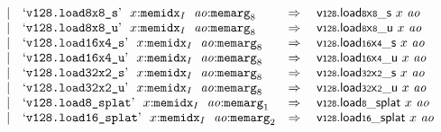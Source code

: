 $$\begin{array}[t]{@{}lrrl@{}l@{}l@{}l@{}}
& & | & \mbox{‘\texttt{v128.load8x8\_s}’}~~x{:}{{\mathtt{memidx}}}_{I}~~{\mathit{ao}}{:}{{\mathtt{memarg}}}_{8} & \quad\Rightarrow\quad{} & {\mathsf{v{\scriptstyle 128}}{.}\mathsf{load}}{{\mathsf{{\scriptstyle 8}}}{\mathsf{x}}{\mathsf{{\scriptstyle 8}}}{\mathsf{\_}}{\mathsf{s}}}~x~{\mathit{ao}} \\
& & | & \mbox{‘\texttt{v128.load8x8\_u}’}~~x{:}{{\mathtt{memidx}}}_{I}~~{\mathit{ao}}{:}{{\mathtt{memarg}}}_{8} & \quad\Rightarrow\quad{} & {\mathsf{v{\scriptstyle 128}}{.}\mathsf{load}}{{\mathsf{{\scriptstyle 8}}}{\mathsf{x}}{\mathsf{{\scriptstyle 8}}}{\mathsf{\_}}{\mathsf{u}}}~x~{\mathit{ao}} \\
& & | & \mbox{‘\texttt{v128.load16x4\_s}’}~~x{:}{{\mathtt{memidx}}}_{I}~~{\mathit{ao}}{:}{{\mathtt{memarg}}}_{8} & \quad\Rightarrow\quad{} & {\mathsf{v{\scriptstyle 128}}{.}\mathsf{load}}{{\mathsf{{\scriptstyle 16}}}{\mathsf{x}}{\mathsf{{\scriptstyle 4}}}{\mathsf{\_}}{\mathsf{s}}}~x~{\mathit{ao}} \\
& & | & \mbox{‘\texttt{v128.load16x4\_u}’}~~x{:}{{\mathtt{memidx}}}_{I}~~{\mathit{ao}}{:}{{\mathtt{memarg}}}_{8} & \quad\Rightarrow\quad{} & {\mathsf{v{\scriptstyle 128}}{.}\mathsf{load}}{{\mathsf{{\scriptstyle 16}}}{\mathsf{x}}{\mathsf{{\scriptstyle 4}}}{\mathsf{\_}}{\mathsf{u}}}~x~{\mathit{ao}} \\
& & | & \mbox{‘\texttt{v128.load32x2\_s}’}~~x{:}{{\mathtt{memidx}}}_{I}~~{\mathit{ao}}{:}{{\mathtt{memarg}}}_{8} & \quad\Rightarrow\quad{} & {\mathsf{v{\scriptstyle 128}}{.}\mathsf{load}}{{\mathsf{{\scriptstyle 32}}}{\mathsf{x}}{\mathsf{{\scriptstyle 2}}}{\mathsf{\_}}{\mathsf{s}}}~x~{\mathit{ao}} \\
& & | & \mbox{‘\texttt{v128.load32x2\_u}’}~~x{:}{{\mathtt{memidx}}}_{I}~~{\mathit{ao}}{:}{{\mathtt{memarg}}}_{8} & \quad\Rightarrow\quad{} & {\mathsf{v{\scriptstyle 128}}{.}\mathsf{load}}{{\mathsf{{\scriptstyle 32}}}{\mathsf{x}}{\mathsf{{\scriptstyle 2}}}{\mathsf{\_}}{\mathsf{u}}}~x~{\mathit{ao}} \\
& & | & \mbox{‘\texttt{v128.load8\_splat}’}~~x{:}{{\mathtt{memidx}}}_{I}~~{\mathit{ao}}{:}{{\mathtt{memarg}}}_{1} & \quad\Rightarrow\quad{} & {\mathsf{v{\scriptstyle 128}}{.}\mathsf{load}}{{\mathsf{{\scriptstyle 8}}}{\mathsf{\_}}{\mathsf{splat}}}~x~{\mathit{ao}} \\
& & | & \mbox{‘\texttt{v128.load16\_splat}’}~~x{:}{{\mathtt{memidx}}}_{I}~~{\mathit{ao}}{:}{{\mathtt{memarg}}}_{2} & \quad\Rightarrow\quad{} & {\mathsf{v{\scriptstyle 128}}{.}\mathsf{load}}{{\mathsf{{\scriptstyle 16}}}{\mathsf{\_}}{\mathsf{splat}}}~x~{\mathit{ao}} \\

\end{array}$$
